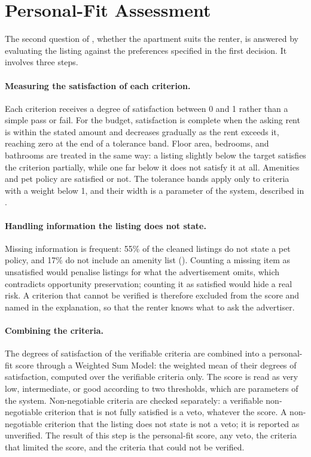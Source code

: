 \documentclass[12pt,a4paper]{report}
\begin{document}
\section{Personal-Fit Assessment}

The second question of , whether the apartment suits the
renter, is answered by evaluating the listing against the preferences
specified in the first decision. It involves three steps.

\paragraph{Measuring the satisfaction of each criterion.} Each criterion
receives a degree of satisfaction between 0 and 1 rather than a simple pass
or fail. For the budget, satisfaction is complete when the asking rent is
within the stated amount and decreases gradually as the rent exceeds it,
reaching zero at the end of a tolerance band. Floor area, bedrooms, and
bathrooms are treated in the same way: a listing slightly below the target
satisfies the criterion partially, while one far below it does not satisfy
it at all. Amenities and pet policy are satisfied or not. The tolerance
bands apply only to criteria with a weight below 1, and their width is a
parameter of the system, described in .

\paragraph{Handling information the listing does not state.} Missing
information is frequent: 55\% of the cleaned listings do not state a pet
policy, and 17\% do not include an amenity list ().
Counting a missing item as
unsatisfied would penalise listings for what the advertisement omits, which
contradicts opportunity preservation; counting it as satisfied would hide a
real risk. A criterion that cannot be verified is therefore excluded from
the score and named in the explanation, so that the renter knows what to
ask the advertiser.

\paragraph{Combining the criteria.} The degrees of satisfaction of the
verifiable criteria are combined into a personal-fit score through a
Weighted Sum Model: the weighted mean of their degrees of satisfaction,
computed over the verifiable criteria only. The score is read as very low,
intermediate, or good according to two thresholds, which are parameters of
the system. Non-negotiable criteria are checked separately: a verifiable
non-negotiable criterion that is not fully satisfied is a veto, whatever
the score. A non-negotiable criterion that the listing does not state is
not a veto; it is reported as unverified. The result of this step is the
personal-fit score, any veto, the criteria that limited the score, and the
criteria that could not be verified.
\end{document}
